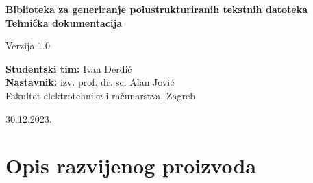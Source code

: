 \begin{titlepage} %

	\raggedleft %
	
	\vspace*{\baselineskip} %
	
	\vspace*{0.167\textheight} %
	
	
	\textbf{\LARGE Biblioteka za generiranje polustrukturiranih tekstnih datoteka}\\[\baselineskip]

	\textbf{\LARGE Tehnička dokumentacija}

	\Large Verzija 1.0
	
	\vspace*{0.167\textheight}

	\textbf{\Large Studentski tim:} \large Ivan Derdić \\[\baselineskip]

	\textbf{\Large Nastavnik:} \large izv. prof. dr. sc. Alan Jović \\[\baselineskip]
	
	\small Fakultet elektrotehnike i računarstva, Zagreb 

	\small 30.12.2023.\\[\baselineskip]

\end{titlepage}


\tableofcontents
\clearpage
{}

\section{Opis razvijenog proizvoda}{}



